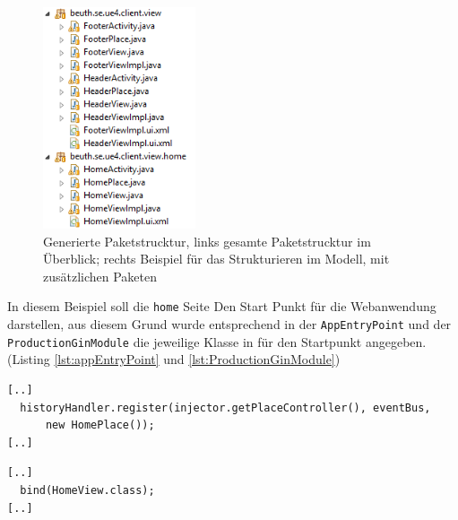 \begin{figure}[htbp]
\begin{center}
\includegraphics[width=0.4\textwidth]{./img/PackagesExample.png}
\caption{Generierte Paketstrucktur, links gesamte
Paketstrucktur im Überblick; rechts Beispiel für das
Strukturieren im Modell, mit zusätzlichen Paketen}\label{Fig:packegeModel}
\end{center}
\end{figure}
 
In diesem Beispiel soll die \texttt{home} Seite Den Start Punkt für die
Webanwendung darstellen, aus diesem Grund wurde entsprechend in der
\texttt{AppEntryPoint} und der \texttt{ProductionGinModule} die jeweilige Klasse
in für den Startpunkt angegeben. (Listing \ref{lst:appEntryPoint} und
\ref{lst:ProductionGinModule}) 
\lstset{language=gwt}
\begin{lstlisting}[caption={Änderung an der AppEntryPoint Klasse zur Bestimmung
der Startseite}, label={lst:appEntryPoint}] 
[..]
  historyHandler.register(injector.getPlaceController(), eventBus,
      new HomePlace());
[..]
\end{lstlisting}
\lstset{language=gwt}
\begin{lstlisting}[caption={Änderung an der ProductionGinModule Klasse zur Bestimmung
der Startseite}, label={lst:ProductionGinModule}] 
[..]
  bind(HomeView.class);
[..]
\end{lstlisting}


